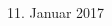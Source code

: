 \begin{titlepage}
\begin{addmargin}[0cm]{0cm}
\begin{center}
{  \vspace{1.0cm}
  \large{11. Januar 2017}%
}
\end{center}
\end{addmargin}
\end{titlepage}
